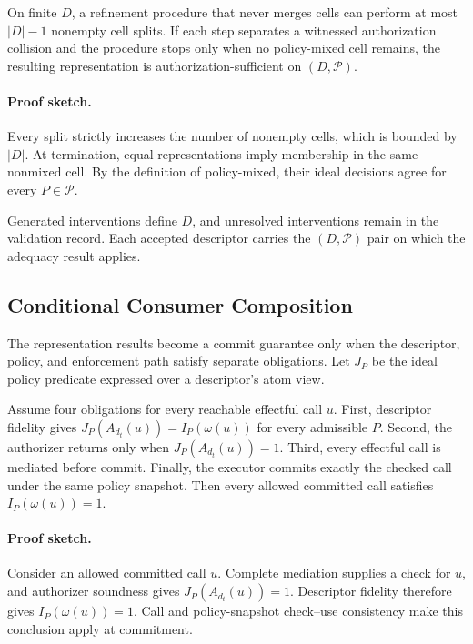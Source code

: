 \begin{proposition}
\label{thm:finite-adequacy}
On finite $D$, a refinement procedure that never merges cells can perform at
most $|D|-1$ nonempty cell splits.  If each step separates a witnessed
authorization collision and the procedure stops only when no policy-mixed cell
remains, the resulting representation is authorization-sufficient on
$(D,\mathcal P)$.
\end{proposition}

\paragraph{Proof sketch.}
Every split strictly increases the number of nonempty cells, which is bounded
by $|D|$.  At termination, equal representations imply membership in the same
nonmixed cell.  By the definition of policy-mixed, their ideal decisions agree
for every $P\in\mathcal P$.

Generated interventions define $D$, and unresolved interventions remain in the
validation record. Each accepted descriptor carries the $(D,\mathcal P)$ pair
on which the adequacy result applies.

\subsection{Conditional Consumer Composition}

The representation results become a commit guarantee only when the descriptor,
policy, and enforcement path satisfy separate obligations.  Let $J_P$ be the
ideal policy predicate expressed over a descriptor's atom view.

\begin{proposition}
\label{thm:conditional-atom-mediation}
Assume four obligations for every reachable effectful call $u$.  First,
descriptor fidelity gives $J_P(A_{d_t}(u))=I_P(\omega(u))$ for every admissible
$P$.  Second, the authorizer returns \Allow{} only when
$J_P(A_{d_t}(u))=1$.  Third, every effectful call is mediated before commit.
Finally, the executor commits exactly the checked call under the same policy
snapshot.  Then every allowed committed call satisfies $I_P(\omega(u))=1$.
\end{proposition}

\paragraph{Proof sketch.}
Consider an allowed committed call $u$.  Complete mediation supplies a check
for $u$, and authorizer soundness gives $J_P(A_{d_t}(u))=1$.  Descriptor
fidelity therefore gives $I_P(\omega(u))=1$.  Call and policy-snapshot
check--use consistency make this conclusion apply at commitment.


